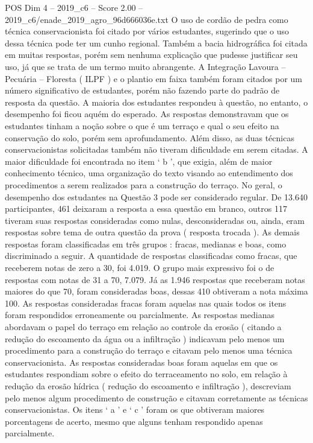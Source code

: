 \begin{textsample}{POS Dim 4 – 2019\_c6 – Score 2.00 – 2019\_c6/enade\_2019\_agro\_96d666036e.txt}
O uso de cordão de pedra como técnica conservacionista foi citado por vários estudantes, sugerindo que o uso dessa técnica pode ter um cunho regional.
Também a bacia hidrográfica foi citada em muitas respostas, porém sem nenhuma explicação que pudesse justificar seu uso, já que se trata de um termo muito abrangente.
A Integração Lavoura – Pecuária – Floresta ( ILPF ) e o plantio em faixa também foram citados por um número significativo de estudantes, porém não fazendo parte do padrão de resposta da questão.
A maioria dos estudantes respondeu à questão, no entanto, o desempenho foi ficou aquém do esperado.
As respostas demonstravam que os estudantes tinham a noção sobre o que é um terraço e qual o seu efeito na conservação do solo, porém sem aprofundamento.
Além disso, as duas técnicas conservacionistas solicitadas também não tiveram dificuldade em serem citadas.
A maior dificuldade foi encontrada no item ‘ b ’, que exigia, além de maior conhecimento técnico, uma organização do texto visando ao entendimento dos procedimentos a serem realizados para a construção do terraço.
No geral, o desempenho dos estudantes na Questão 3 pode ser considerado regular.
De 13.640 participantes, 461 deixaram a resposta a essa questão em branco, outros 117 tiveram suas respostas consideradas como nulas, desconsideradas ou, ainda, eram respostas sobre tema de outra questão da prova ( resposta trocada ).
As demais respostas foram classificadas em três grupos : fracas, medianas e boas, como discriminado a seguir.
A quantidade de respostas classificadas como fracas, que receberem notas de zero a 30, foi 4.019.
O grupo mais expressivo foi o de respostas com notas de 31 a 70, 7.079.
Já as 1.946 respostas que receberam notas maiores do que 70, foram consideradas boas, dessas 410 obtiveram a nota máxima 100.
As respostas consideradas fracas foram aquelas nas quais todos os itens foram respondidos erroneamente ou parcialmente.
As respostas medianas abordavam o papel do terraço em relação ao controle da erosão ( citando a redução do escoamento da água ou a infiltração ) indicavam pelo menos um procedimento para a construção do terraço e citavam pelo menos uma técnica conservacionista.
As respostas consideradas boas foram aquelas em que os estudantes respondiam sobre o efeito do terraceamento no solo, em relação à redução da erosão hídrica ( redução do escoamento e infiltração ), descreviam pelo menos algum procedimento de construção e citavam corretamente as técnicas conservacionistas.
Os itens ‘ a ’ e ‘ c ’ foram os que obtiveram maiores porcentagens de acerto, mesmo que alguns tenham respondido apenas parcialmente.

\end{textsample}
